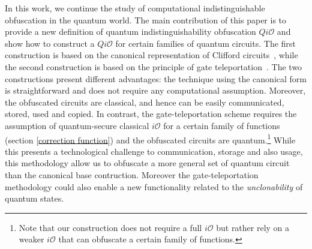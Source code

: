In this work, we continue the study of computational indistinguishable obfuscation in the quantum world. The main contribution of this paper is to provide a new definition of quantum indistinguishability obfuscation $Qi\mathcal{O}$ and show how to construct a $Qi\mathcal{O}$ for certain families of quantum circuits. The first construction is based on the canonical representation of Clifford circuits~\cite{AG04}, while the second construction is based on the principle of gate teleportation~\cite{GC99}. The two constructions present different advantages: the technique using the canonical form is straightforward and does not require any computational assumption. Moreover, the obfuscated circuits are classical, and hence can be easily communicated, stored, used and copied.  In contrast, the gate-teleportation scheme requires the assumption of quantum-secure classical $i\mathcal{O}$ for a certain family of functions (section \ref{correction function}) and the obfuscated circuits are quantum.\footnote{Note that our construction does not require a full $i\mathcal{O}$ but rather rely on a weaker $i\mathcal{O}$ that can obfuscate a certain family of functions.} While this presents a technological challenge to communication, storage and also usage, this methodology allow us to obfuscate a more general set of quantum circuit than the canonical base contruction. Moreover the gate-teleportation methodology could also enable a new functionality related to the \emph{unclonability} of quantum states.

